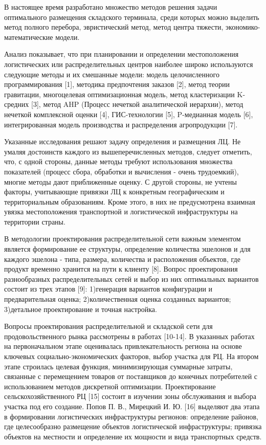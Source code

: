 \begin{multicols}{2}
В настоящее время разработано множество методов решения задачи
оптимального размещения складского терминала, среди которых можно
выделить метод полного перебора, эвристический метод, метод центра
тяжести, экономико-математические модели.

Анализ показывает, что при планировании и определении местоположения
логистических или распределительных центров наиболее широко используются
следующие методы и их смешанные модели: модель целочисленного
программирования {[}1{]}, методика предпочтения заказов {[}2{]}, метод
теории гравитации, многоцелевая оптимизационная модель, метод
кластеризации K-средних {[}3{]}, метод AHP (Процесс нечеткой
аналитической иерархии), метод нечеткой комплексной оценки {[}4{]},
ГИС-технологии {[}5{]}, P-медианная модель {[}6{]}, интегрированная
модель производства и распределения агропродукции {[}7{]}.

Указанные исследования решают задачу определения и размещения ЛЦ. Не
умаляя достоинств каждого из вышеперечисленных методов, следует
отметить, что, с одной стороны, данные методы требуют использования
множества показателей (процесс сбора, обработки и вычисления - очень
трудоемкий), многие методы дают приближенные оценку. С другой стороны,
не учтены факторы, учитывающие привязки ЛЦ к конкретным географическим и
территориальным образованиям. Кроме этого, в них не предусмотрена
взаимная увязка местоположения транспортной и логистической
инфраструктуры на территории страны.

В методологии проектирования распределительной сети важным элементом
является формирование ее структуры, определение количества эшелонов и
для каждого эшелона - типа, размера, количества и расположения объектов,
где продукт временно хранится на пути к клиенту {[}8{]}. Вопрос
проектирования разнообразных распределительных сетей и выбор из них
оптимальных вариантов состоит из трех этапов {[}9{]}: 1)генерация
вариантов конфигурации и предварительная оценка; 2)количественная оценка
созданных вариантов; 3)детальное проектирование и точная настройка.

Вопросы проектирования распределительной и складской сети для
продовольственного рынка рассмотрены в работах {[}10-14{]}. В указанных
работах на первоначальном этапе оценивалась привлекательность региона на
основе ключевых социально-экономических факторов, выбор участка для РЦ.
На втором этапе строилась целевая функция, минимизирующая суммарные
затраты, связанные с перемещением товаров от поставщиков до конечных
потребителей с использованием методов дискретной оптимизации.
Проектирование сельскохозяйственного РЦ {[}15{]} состоит в изучении зоны
обслуживания и выбора участка под его создание. Попов П. В., Мирецкий И.
Ю. {[}16{]} выделяют два этапа в формировании логистических
инфраструктуры регионов: определение районов, где целесообразно
размещение объектов логистической инфраструктуры; привязка объектов на
местности и определение их мощности и вида транспортных средств.


\end{multicols}
